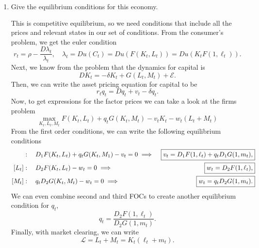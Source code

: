 \documentclass[11pt,english]{article}
\begin{document}
\begin{enumerate}
    \item[\textbf{a.}] Give the equilibrium conditions for this economy.
    \begin{solution}
This is competitive equilibrium, so we need conditions that include all the prices and relevant states in our set of conditions. From the consumer's problem, we get the euler condition $$\boxed{r_t = \rho - \frac{D\lambda_t}{\lambda_t}, \quad \lambda_t = Du(C_t) = Du(F(K_t, L_t)) = Du(K_t F(1, \ell_t)).}$$ Next, we know from the problem that the dynamics for capital is $$\boxed{DK_t = -\delta K_t + G(L_t, M_t) + \mathcal{E}.}$$Then, we can write the asset pricing equation for capital to be $$\boxed{r_tq_t = Dq_t + v_t - \delta q_t.}$$ Now, to get expressions for the factor prices we can take a look at the firms problem $$\max_{K_t, L_t, M_t} F(K_t, L_t) + q_tG(K_t, M_t) - v_tK_t - w_t(L_t + M_t)$$ From the first order conditions, we can write the following equilibrium conditions
\begin{align*}
[K_t]&:\quad D_1F(K_t, L_t) + q_t G(K_t, M_1) - v_t = 0 \implies \Aboxed{v_t = D_1F(1, \ell_t) + q_t D_1G(1, m_t),}\\
[L_t]&:\quad D_2 F(K_t, L_t) - w_t = 0 \implies \Aboxed{w_t = D_2F(1, \ell_t),}\\
[M_t]&:\quad q_t D_2 G(K_t, M_t) - w_t = 0 \implies \Aboxed{w_t = q_t D_2 G(1, m_t).}
\end{align*}
We can even combine second and third FOCs to create another equilibrium condition for $q_t$, $$\boxed{q_t  = \frac{D_2 F(1, \ell_t)}{D_2 G(1, m_t)}.}$$
Finally, with market clearing, we can write $$\boxed{\mathcal{L} = L_t + M_t = K_t(\ell_t+ m_t).}$$

    \end{solution}
 

\end{enumerate}
\end{document}
